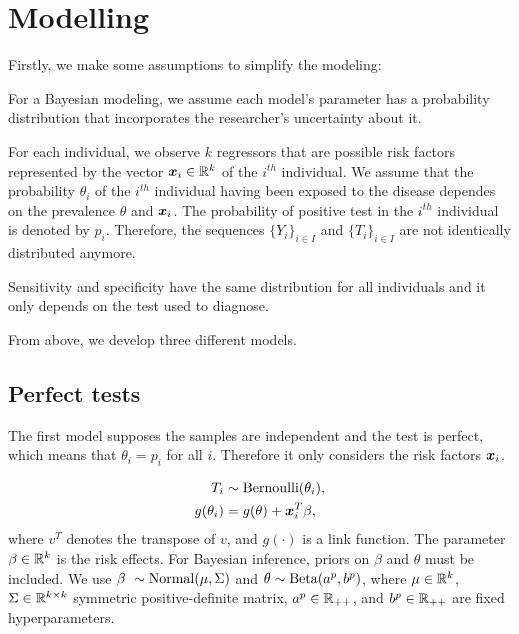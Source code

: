 \chapter{Modelling}

Firstly, we make some assumptions to simplify the modeling:

\begin{assumption}  
  For a Bayesian modeling, we assume each model's parameter has a probability distribution that incorporates the researcher's uncertainty about it. 
\end{assumption}

\begin{assumption}
  For each individual, we observe $k$ regressors that are possible
  risk factors represented by the vector $\boldsymbol{x}_i \in \mathbb{R}^{k}$ of the $i^{th}$
  individual. We assume that the probability $\theta_i$ of the $i^{th}$ individual having been exposed
  to the disease dependes on the prevalence $\theta$ and $\boldsymbol{x}_i$. The
  probability of positive test in the $i^{th}$ individual is denoted by $p_i$. Therefore, the sequences $\{Y_i\}_{i \in I}$ and $\{T_i\}_{i \in I}$ are not
  identically distributed anymore.
\end{assumption}

\begin{assumption}
  Sensitivity and specificity have the same distribution for all
  individuals and it only depends on the test used to diagnose. 
\end{assumption}

From above, we develop three different models.

\section{Perfect tests}

The first model supposes the samples are independent and the test is perfect,
which means that $\theta_i = p_i$ for all $i$. Therefore it only considers the risk factors $\boldsymbol{x}_i$. 

\begin{equation}
  \begin{aligned}
    T_i &\sim \operatorname{Bernoulli}(\theta_i), \\
    g(\theta_i) &= g(\theta) + \boldsymbol{x}_i^T\beta, 
  \end{aligned}  
\end{equation}
where $v^T$ denotes the transpose of $v$, and $g(\cdot)$ is a link function.
The parameter $\beta \in \mathbb{R}^{k}$ is the risk effects. For Bayesian inference, priors on
$\beta$ and $\theta$ must be included. We use $\beta ~ \sim \operatorname{Normal}(\mu, \Sigma)$
and $\theta \sim \operatorname{Beta}(a^{p}, b^p)$, where $\mu
\in \mathbb{R}^{k}$, $\Sigma \in \mathbb{R}^{k\times k}$ symmetric positive-definite matrix,
$a^p \in \mathbb{R}_{++}$, and $b^p \in \mathbb{R}_{++}$
are fixed hyperparameters. 

